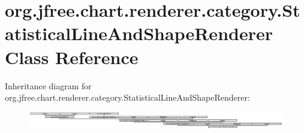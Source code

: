 \hypertarget{classorg_1_1jfree_1_1chart_1_1renderer_1_1category_1_1_statistical_line_and_shape_renderer}{}\section{org.\+jfree.\+chart.\+renderer.\+category.\+Statistical\+Line\+And\+Shape\+Renderer Class Reference}
\label{classorg_1_1jfree_1_1chart_1_1renderer_1_1category_1_1_statistical_line_and_shape_renderer}
Inheritance diagram for org.\+jfree.\+chart.\+renderer.\+category.\+Statistical\+Line\+And\+Shape\+Renderer\+:\begin{figure}[H]
\begin{center}
\leavevmode
\includegraphics[height=0.771988cm]{classorg_1_1jfree_1_1chart_1_1renderer_1_1category_1_1_statistical_line_and_shape_renderer}
\end{center}
\end{figure}
